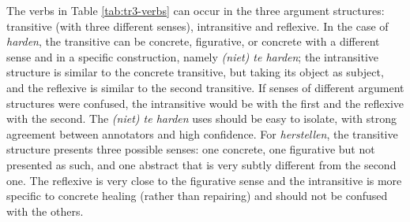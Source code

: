 \documentclass[
]{book}
\begin{document}
The verbs in Table \ref{tab:tr3-verbs} can occur in the three argument structures: transitive (with three different senses), intransitive and reflexive. In the case of \emph{harden}, the transitive can be concrete, figurative, or concrete with a different sense and in a specific construction, namely \emph{(niet) te harden}; the intransitive structure is similar to the concrete transitive, but taking its object as subject, and the reflexive is similar to the second transitive. If senses of different argument structures were confused, the intransitive would be with the first and the reflexive with the second. The \emph{(niet) te harden} uses should be easy to isolate, with strong agreement between annotators and high confidence. For \emph{herstellen}, the transitive structure presents three possible senses: one concrete, one figurative but not presented as such, and one abstract that is very subtly different from the second one. The reflexive is very close to the figurative sense and the intransitive is more specific to concrete healing (rather than repairing) and should not be confused with the others.

\providecommand{\docline}[3]{\noalign{\global\setlength{\arrayrulewidth}{#1}}\arrayrulecolor[HTML]{#2}\cline{#3}}

\setlength{\tabcolsep}{2pt}

\renewcommand*{\arraystretch}{1.5}
\end{document}
